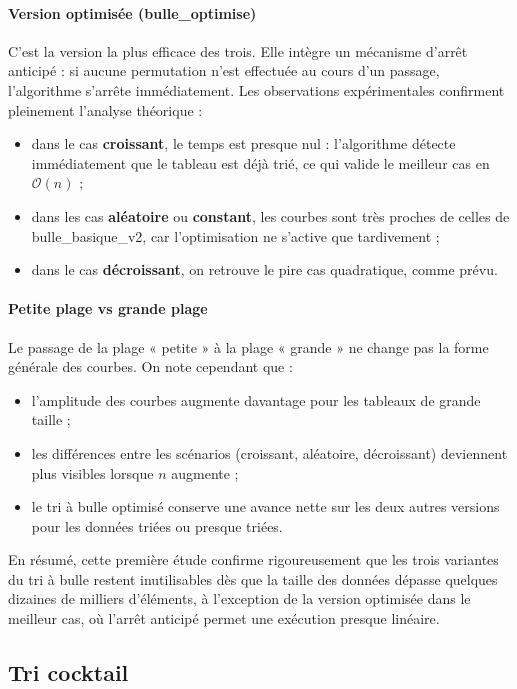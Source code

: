 \documentclass[11pt,a4paper]{article}
\begin{document}
\paragraph{Version optimisée (bulle\_optimise)}
C’est la version la plus efficace des trois. Elle intègre un mécanisme d’arrêt anticipé :
si aucune permutation n’est effectuée au cours d’un passage, l’algorithme s’arrête
immédiatement. Les observations expérimentales confirment pleinement l’analyse
théorique :
\begin{itemize}
    \item dans le cas \textbf{croissant}, le temps est presque nul : l’algorithme détecte
          immédiatement que le tableau est déjà trié, ce qui valide le meilleur cas
          en $\mathcal{O}(n)$ ;
    \item dans les cas \textbf{aléatoire} ou \textbf{constant}, les courbes sont très
          proches de celles de bulle\_basique\_v2, car l’optimisation ne s’active que tardivement ;
    \item dans le cas \textbf{décroissant}, on retrouve le pire cas quadratique, comme prévu.
\end{itemize}

\paragraph{Petite plage vs grande plage}
Le passage de la plage « petite » à la plage « grande » ne change pas la forme générale
des courbes. On note cependant que :
\begin{itemize}
    \item l’amplitude des courbes augmente davantage pour les tableaux de grande taille ;
    \item les différences entre les scénarios (croissant, aléatoire, décroissant)
          deviennent plus visibles lorsque $n$ augmente ;
    \item le tri à bulle optimisé conserve une avance nette sur les deux autres versions
          pour les données triées ou presque triées.
\end{itemize}

En résumé, cette première étude confirme rigoureusement que les trois variantes
du tri à bulle restent inutilisables dès que la taille des données dépasse quelques dizaines
de milliers d’éléments, à l’exception de la version optimisée dans le meilleur cas,
où l’arrêt anticipé permet une exécution presque linéaire.

\subsection{Tri cocktail}
\end{document}
